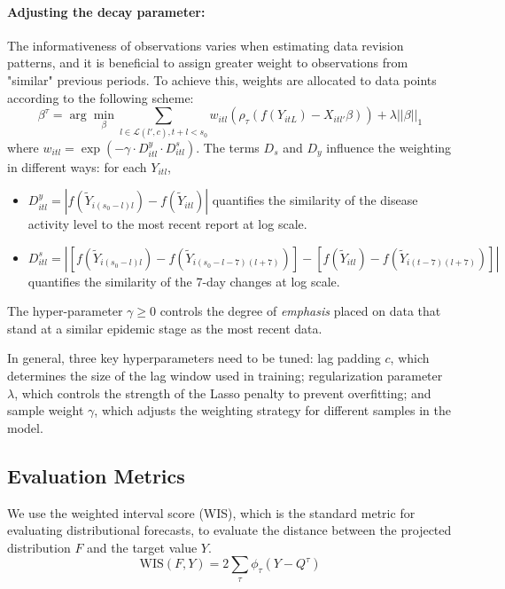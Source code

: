 \paragraph{Adjusting the decay parameter: } The informativeness of observations varies when estimating data revision patterns, and it is beneficial to assign greater weight to observations from "similar" previous periods. To achieve this, weights are allocated to data points according to the following scheme:
\[
\beta^{\tau} = \arg\min_{\beta} \sum_{l \in \mathcal{L}(l', c), t+l < s_0} w_{itl} \left( \rho_\tau \left( f(Y_{itL}) - X_{itl'}\beta \right) \right) + \lambda ||\beta||_1
\]
where \( w_{itl} = \exp(-\gamma \cdot D^y_{itl} \cdot D^s_{itl}) \). The terms \( D_s \) and \( D_y \) influence the weighting in different ways: for each \( Y_{itl} \),
\begin{itemize}
    \item \( D^y_{itl} = |f(\widetilde{Y}_{i(s_0 - l) l}) - f(\widetilde{Y}_{itl})| \) quantifies the similarity of the disease activity level to the most recent report at log scale.
    \item \( D^s_{itl} = |[f(\widetilde{Y}_{i(s_0 - l) l}) - f(\widetilde{Y}_{i(s_0 - l - 7)(l + 7)})] - [f(\widetilde{Y}_{itl}) - f(\widetilde{Y}_{i(t - 7)(l + 7)})]| \) quantifies the similarity of the 7-day changes at log scale. 
\end{itemize}
The hyper-parameter \( \gamma \geq 0 \) controls the degree of \textit{emphasis} placed on data that stand at a similar epidemic stage as the most recent data.



In general, three key hyperparameters need to be tuned: lag padding $c$, which determines the size of the lag window used in training; regularization parameter $\lambda$, which controls the strength of the Lasso penalty to prevent overfitting; and sample weight $\gamma$, which adjusts the weighting strategy for different samples in the model.

\subsection{Evaluation Metrics}

We use the weighted interval score (WIS)\cite{gneiting2007strictly}, which is the standard metric for evaluating distributional forecasts, to evaluate the distance between the projected distribution $F$ and the target value $Y$.
$$
    \mbox{WIS}(F, Y) = 2\sum_{\tau}\phi_{\tau}(Y-Q^{\tau})
$$

